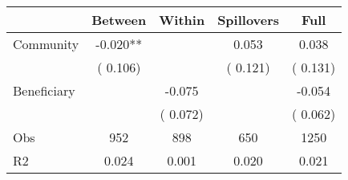 
\begin{tabular}{l*{4}{c}}\hline&\multicolumn{1}{c}{Between}&\multicolumn{1}{c}{Within}&\multicolumn{1}{c}{Spillovers}&\multicolumn{1}{c}{Full}\\ \hline
 Community             &             -0.020**      &                                               &        0.053 &         0.038                            \\ 
                               &        (       0.106)           &                                       &       (       0.121)     &      (       0.131)                                           \\ 
 Beneficiary   &                                               &       -0.075    &                                &            -0.054                            \\ 
                               &                                               & (       0.072)                  &                                        &      (       0.062)                                           \\ 
\hline                                                                                                                                                                                                                                            
 Obs                   &               952               &       898                       &       650                &              1250                                               \\ 
 R2                    &                      0.024              &              0.001                      &              0.020               &                     0.021                                              \\ 
\hline \end{tabular}                                                                                                                                                                                                              